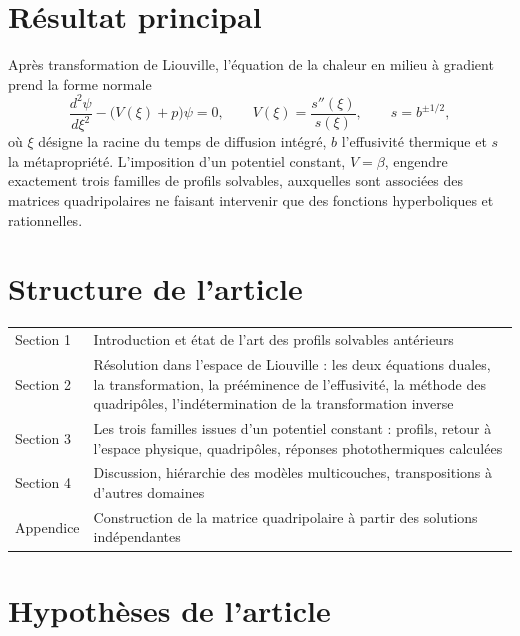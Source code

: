 \documentclass[11pt,a4paper]{article}
\begin{document}
\section{Résultat principal}

Après transformation de Liouville, l'équation de la chaleur en milieu à gradient prend la forme normale
\[ \frac{d^{2}\psi}{d\xi^{2}} - \bigl(V(\xi) + p\bigr)\psi = 0 ,
\qquad V(\xi) = \frac{s''(\xi)}{s(\xi)} , \qquad s = b^{\pm 1/2} , \]
où $\xi$ désigne la racine du temps de diffusion intégré, $b$ l'effusivité thermique et $s$ la
métapropriété. L'imposition d'un potentiel constant, $V = \beta$, engendre exactement trois familles de
profils solvables, auxquelles sont associées des matrices quadripolaires ne faisant intervenir que des
fonctions hyperboliques et rationnelles.

\section{Structure de l'article}

\begin{center}
\begin{tabularx}{\textwidth}{@{}lX@{}}
\toprule
Section 1 & Introduction et état de l'art des profils solvables antérieurs \\
Section 2 & Résolution dans l'espace de Liouville : les deux équations duales, la transformation, la
prééminence de l'effusivité, la méthode des quadripôles, l'indétermination de la transformation
inverse \\
Section 3 & Les trois familles issues d'un potentiel constant : profils, retour à l'espace physique,
quadripôles, réponses photothermiques calculées \\
Section 4 & Discussion, hiérarchie des modèles multicouches, transpositions à d'autres domaines \\
Appendice & Construction de la matrice quadripolaire à partir des solutions indépendantes \\
\bottomrule
\end{tabularx}
\end{center}

\section{Hypothèses de l'article}
\end{document}
